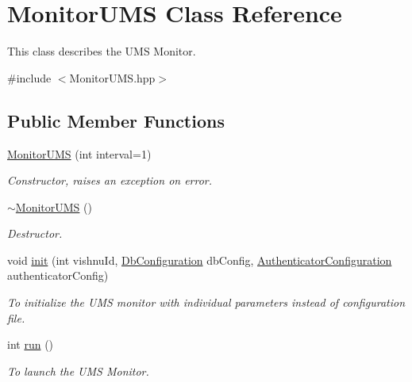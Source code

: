 \hypertarget{classMonitorUMS}{
\section{MonitorUMS Class Reference}
\label{classMonitorUMS}
}


This class describes the UMS Monitor.  




{\ttfamily \#include $<$MonitorUMS.hpp$>$}

\subsection*{Public Member Functions}
\begin{DoxyCompactItemize}
\item 
\hyperlink{classMonitorUMS_ab3e7af32b9eb1e778ade65438d52fd8b}{MonitorUMS} (int interval=1)
\begin{DoxyCompactList}\small\item\em Constructor, raises an exception on error. \item\end{DoxyCompactList}\item 
\hypertarget{classMonitorUMS_a4dd94f7d4a5cfafb4c668cde6f231e3e}{
\hyperlink{classMonitorUMS_a4dd94f7d4a5cfafb4c668cde6f231e3e}{$\sim$MonitorUMS} ()}
\label{classMonitorUMS_a4dd94f7d4a5cfafb4c668cde6f231e3e}

\begin{DoxyCompactList}\small\item\em Destructor. \item\end{DoxyCompactList}\item 
void \hyperlink{classMonitorUMS_ac472faf565e27fda5fa2be4f01e58e85}{init} (int vishnuId, \hyperlink{classDbConfiguration}{DbConfiguration} dbConfig, \hyperlink{classAuthenticatorConfiguration}{AuthenticatorConfiguration} authenticatorConfig)
\begin{DoxyCompactList}\small\item\em To initialize the UMS monitor with individual parameters instead of configuration file. \item\end{DoxyCompactList}\item 
int \hyperlink{classMonitorUMS_aa4e9d26960b0519c7bfd4e470d1fc0a7}{run} ()
\begin{DoxyCompactList}\small\item\em To launch the UMS Monitor. \item\end{DoxyCompactList}\end{DoxyCompactItemize}
